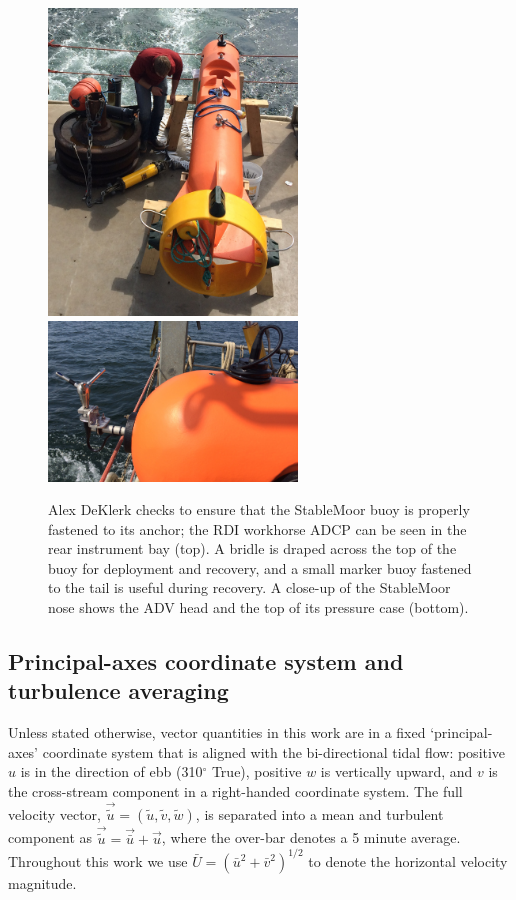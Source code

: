 \documentclass[twocol]{ametsoc}
\begin{document}
\begin{figure}[t]
  \centering
  \includegraphics[width=2.6in]{SM_ondeck01}
  \includegraphics[width=2.6in]{SM_NoseMode01}
  \caption{Alex DeKlerk checks to ensure that the StableMoor buoy is properly fastened to its anchor; the RDI workhorse ADCP can be seen in the rear instrument bay (top). A bridle is draped across the top of the buoy for deployment and recovery, and a small marker buoy fastened to the tail is useful during recovery.  A close-up of the StableMoor nose shows the ADV head and the top of its pressure case (bottom). }
  \label{fig:SM}
\end{figure}


\subsection{Principal-axes coordinate system and turbulence averaging}

Unless stated otherwise, vector quantities in this work are in a fixed `principal-axes' coordinate system that is aligned with the bi-directional tidal flow: positive $u$ is in the direction of ebb (310$^\circ$ True), positive $w$ is vertically upward, and $v$ is the cross-stream component in a right-handed coordinate system. The full velocity vector, $\vec{\tilde{u}} = (\tilde{u}, \tilde{v}, \tilde{w})$, is separated into a mean and turbulent component as $\vec{\tilde{u}} = \vec{\bar{u}} + \vec{u}$, where the over-bar denotes a 5 minute average. Throughout this work we use $\bar{U} = (\bar{u}^2+\bar{v}^2)^{1/2}$ to denote the horizontal velocity magnitude.
\end{document}
